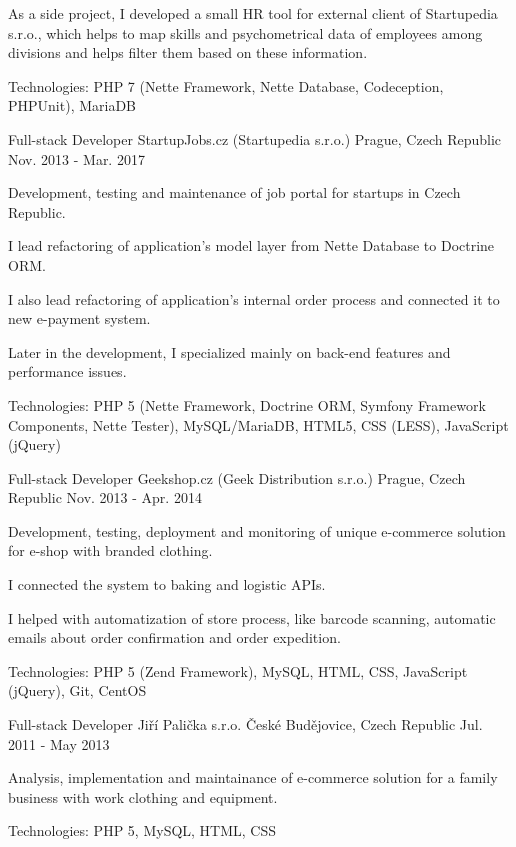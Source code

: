 \begin{cventries}
{\begin{cvitems}
        \item {As a side project, I developed a small HR tool for external client of Startupedia s.r.o., which helps to map skills and psychometrical data of employees among divisions and helps filter them based on these information.}
        \item {Technologies: PHP 7 (Nette Framework, Nette Database, Codeception, PHPUnit), MariaDB}
      \end{cvitems}
    }
  \cventry
    {Full-stack Developer}
    {StartupJobs.cz (Startupedia s.r.o.)}
    {Prague, Czech Republic}
    {Nov. 2013 - Mar. 2017}
    {
      \begin{cvitems}
        \item {Development, testing and maintenance of job portal for startups in Czech Republic.}
        \item {I lead refactoring of application's model layer from Nette Database to Doctrine ORM.}
        \item {I also lead refactoring of application's internal order process and connected it to new e-payment system.}
        \item {Later in the development, I specialized mainly on back-end features and performance issues.}
        \item {Technologies: PHP 5 (Nette Framework, Doctrine ORM, Symfony Framework Components, Nette Tester), MySQL/MariaDB, HTML5, CSS (LESS), JavaScript (jQuery)}
      \end{cvitems}
    }
  \cventry
    {Full-stack Developer}
    {Geekshop.cz (Geek Distribution s.r.o.)}
    {Prague, Czech Republic}
    {Nov. 2013 - Apr. 2014}
    {
      \begin{cvitems}
        \item {Development, testing, deployment and monitoring of unique e-commerce solution for e-shop with branded clothing.}
        \item {I connected the system to baking and logistic APIs.}
        \item {I helped with automatization of store process, like barcode scanning, automatic emails about order confirmation and order expedition.}
        \item {Technologies: PHP 5 (Zend Framework), MySQL, HTML, CSS, JavaScript (jQuery), Git, CentOS}
      \end{cvitems}
    }
  \cventry
    {Full-stack Developer}
    {Jiří Palička s.r.o.}
    {České Budějovice, Czech Republic}
    {Jul. 2011 - May 2013}
    {
      \begin{cvitems}
        \item {Analysis, implementation and maintainance of e-commerce solution for a family business with work clothing and equipment.}
        \item {Technologies: PHP 5, MySQL, HTML, CSS}
      \end{cvitems}
    }
\end{cventries}
